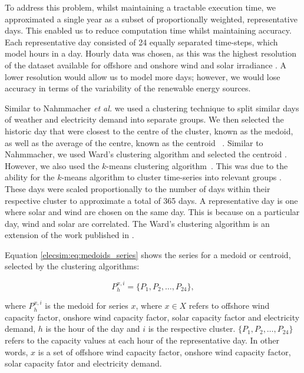 To address this problem, whilst maintaining a tractable execution time, we approximated a single year as a subset of proportionally weighted, representative days. This enabled us to reduce computation time whilst maintaining accuracy. Each representative day consisted of 24 equally separated time-steps, which model hours in a day. Hourly data was chosen, as this was the highest resolution of the dataset available for offshore and onshore wind and solar irradiance \cite{Pfenninger2016}. A lower resolution would allow us to model more days; however, we would lose accuracy in terms of the variability of the renewable energy sources. 


Similar to Nahmmacher \textit{et al.} \cite{Nahmmacher2016} we used a clustering technique to split similar days of weather and electricity demand into separate groups. We then selected the historic day that were closest to the centre of the cluster, known as the medoid, as well as the average of the centre, known as the centroid ~\cite{Nahmmacher2016}. Similar to Nahmmacher, we used Ward's clustering algorithm and selected the centroid \cite{doi:10.1080/01621459.1963.10500845}. However, we also used the $k$-means clustering algorithm~\cite{forgy65}. This was due to the ability for the $k$-means algorithm to cluster time-series into relevant groups \cite{Kell2018a}. These days were scaled proportionally to the number of days within their respective cluster to approximate a total of 365 days. A representative day is one where solar and wind are chosen on the same day. This is because on a particular day, wind and solar are correlated. The Ward's clustering algorithm is an extension of the work published in \cite{Kell2020}.

Equation \ref{elecsim:eq:medoids_series} shows the series for a medoid or centroid, selected by the clustering algorithms:

\begin{equation}
\label{elecsim:eq:medoids_series}
P^{x,i}_{h}=\{P_1, P_2, \ldots, P_{24}\},
\end{equation}

\noindent where $P^{x,i}_{h}$ is the medoid for series $x$, where $x\in X$ refers to offshore wind capacity factor, onshore wind capacity factor, solar capacity factor and electricity demand, $h$ is the hour of the day and $i$ is the respective cluster. $\{P_1, P_2, \ldots , P_{24}\}$ refers to the capacity values at each hour of the representative day. In other words, $x$ is a set of offshore wind capacity factor, onshore wind capacity factor, solar capacity fator and electricity demand.

